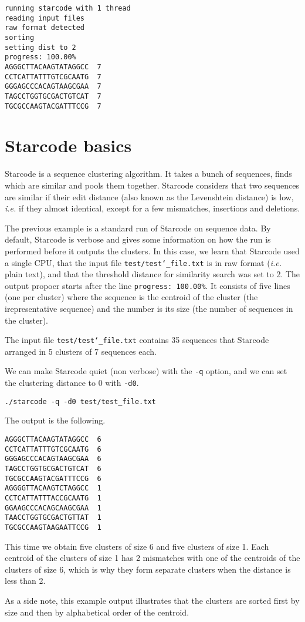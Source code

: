 \documentclass[12pt]{article}
\begin{document}
\begin{verbatim}
running starcode with 1 thread
reading input files
raw format detected
sorting
setting dist to 2
progress: 100.00%
AGGGCTTACAAGTATAGGCC  7
CCTCATTATTTGTCGCAATG  7
GGGAGCCCACAGTAAGCGAA  7
TAGCCTGGTGCGACTGTCAT  7
TGCGCCAAGTACGATTTCCG  7
\end{verbatim}

\section{Starcode basics}

Starcode is a sequence clustering algorithm. It takes a bunch of
sequences, finds which are similar and pools them together. Starcode
considers that two sequences are similar if their edit distance
(also known as the Levenshtein distance) is low, \textit{i.e.}
if they almost identical, except for a few mismatches, insertions
and deletions.

The previous example is a standard run of Starcode on sequence
data. By default, Starcode is verbose and gives some information on
how the run is performed before it outputs the clusters. 
In this case, we learn that Starcode used a single CPU, that
the input file \texttt{test/test\char`_file.txt} is in raw format
(\textit{i.e.} plain text), and that the threshold distance for
similarity search was set to 2. The output propoer starts after
the line \texttt{progress: 100.00\%}. It consists of five lines
(one per cluster) where the sequence is the centroid of the cluster
(the irepresentative sequence) and the number is its size (the
number of sequences in the cluster).

The input file \texttt{test/test\char`_file.txt} contains 35 sequences
that Starcode arranged in 5 clusters of 7 sequences each.


We can make Starcode quiet (non verbose) with the \texttt{-q} option,
and we can set the clustering distance to 0 with \texttt{-d0}.

\begin{verbatim}
./starcode -q -d0 test/test_file.txt
\end{verbatim}

The output is the following.

\begin{verbatim}
AGGGCTTACAAGTATAGGCC  6
CCTCATTATTTGTCGCAATG  6
GGGAGCCCACAGTAAGCGAA  6
TAGCCTGGTGCGACTGTCAT  6
TGCGCCAAGTACGATTTCCG  6
AGGGGTTACAAGTCTAGGCC  1
CCTCATTATTTACCGCAATG  1
GGAAGCCCACAGCAAGCGAA  1
TAACCTGGTGCGACTGTTAT  1
TGCGCCAAGTAAGAATTCCG  1
\end{verbatim}

This time we obtain five clusters of size 6 and five clusters of size 1.
Each centroid of the clusters of size 1 has 2 mismatches with one
of the centroids of the clusters of size 6, which is why they form
separate clusters when the distance is less than 2.

As a side note, this example output illustrates that the clusters
are sorted first by size and then by alphabetical order of the
centroid.
\end{document}
